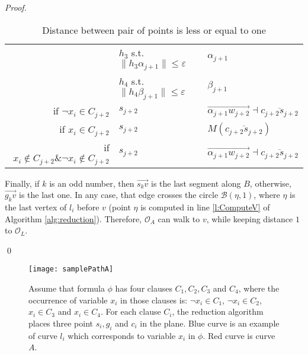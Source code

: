 \documentclass[a4paper,UKenglish]{lipics}
\newcommand{\eps}{\varepsilon}
\newcommand{\CB}{{\mathscr B}}
\newcommand{\CS}{{\mathscr S}}
\newcommand{\CO}{{\mathscr O}}
\newcommand{\CQ}{{\mathscr Q}}
\newcommand{\cfev}{{l}} \newcommand{\sq}{{\CS\CQ}}
\newcommand{\Seg}[1]{{\overline{#1}}}
\newcommand{\Dir}{\overrightarrow}
\begin{document}
\begin{proof}
\begin{table}[h]
\begin{tabular}{ r | l | l  }
\hline

	&  $h_3$ s.t.  $\| h_3\alpha_{j+1} \| \le \eps$ & $\alpha_{j+1}$\\
	&  	$h_4$ s.t.  $\| h_4 \beta_{j+1} \| \le \eps$ & $\beta_{j+1}$\\
\hline









 if $\neg x_i \in C_{j+2}$  & $s_{j+2}$ & $\Dir{\alpha_{j+1}w_{j+2}} 	\dashv \Seg{c_{j+2}s_{j+2}}$ \\
   if $ x_i \in C_{j+2}$  & $s_{j+2}$ & $M(\Seg{c_{j+2}s_{j+2}})$\\
   if $x_i \notin C_{j+2} \& \neg x_i \notin C_{j+2}$  & $s_{j+2}$ & $\Dir{\alpha_{j+1}w_{j+2}}	\dashv \Seg{c_{j+2}s_{j+2}}$\\

\end{tabular}
\caption{Distance between pair of points is less or equal to one}
\label{tab:PathA}
\end{table}





Finally, if $k$ is an odd number, then  
$\Dir{s_kv}$ is the last segment along $B$, otherwise, 
$\Dir{g_kv}$ is the last one. In any case, 
that edge crosses  the circle $\CB(\eta,1)$, where $\eta$ is the last vertex of 
$\cfev_i$ before $v$ (point $\eta$ is computed in line \ref{l:ComputeV} of 
Algorithm \ref{alg:reduction}). Therefore, 
 $\CO_A$ can walk to $v$, while keeping distance $1$ to $\CO_L$. 


\qed
\end{proof}





\begin{figure}[t]
	\centering
	\texttt{[image: samplePathA]}
	\caption{Assume that formula $\phi$ has four clauses $C_1, C_2, C_3$ and $C_4$, 
where the occurrence of variable $x_i$  in those clauses is:
$\neg x_i \in C_1$, $ \neg x_i \in C_2$, $x_i \in C_3$ and $x_i \in C_4$.  
For each clause $C_i$, the reduction algorithm places three point $s_i,g_i$ and $c_i$ in the plane. Blue curve is an example of curve $\cfev_i$ which corresponds to variable $x_i$ in $\phi$. Red curve is curve $A$. 
 }
	\label{fig:pathAExample}
\end{figure}
\end{document}
